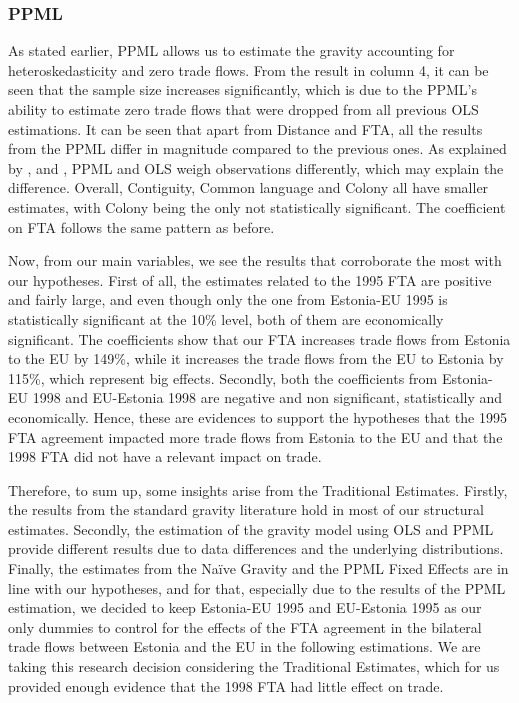 \documentclass[a4paper,10pt]{article}
\begin{document}
\subsubsection{PPML} \label{results_traditional_ppml}

As stated earlier, PPML allows us to estimate the gravity accounting for heteroskedasticity and zero trade flows. From the result in column 4, it can be seen that the sample size increases significantly, which is due to the PPML’s ability to estimate zero trade flows that were dropped from all previous OLS estimations. It can be seen that apart from Distance and FTA, all the results from the PPML differ in magnitude compared to the previous ones. As explained by \cite{larch_currency_2019}, and \cite{head_chapter_2014}, PPML and OLS weigh observations differently, which may explain the difference. Overall, Contiguity, Common language and Colony all have smaller estimates, with Colony being the only not statistically significant. The coefficient on FTA follows the same pattern as before.

Now, from our main variables, we see the results that corroborate the most with our hypotheses. First of all, the estimates related to the 1995 FTA are positive and fairly large, and even though only the one from Estonia-EU 1995 is statistically significant at the 10\% level, both of them are economically significant. The coefficients show that our FTA increases trade flows from Estonia to the EU by 149\%, while it increases the trade flows from the EU to Estonia by 115\%, which represent big effects. Secondly, both the coefficients from Estonia-EU 1998 and EU-Estonia 1998 are negative and non significant, statistically and economically. Hence, these are evidences to support the hypotheses that the 1995 FTA agreement impacted more trade flows from Estonia to the EU and that the 1998 FTA did not have a relevant impact on trade.

Therefore, to sum up, some insights arise from the Traditional Estimates. Firstly, the results from the standard gravity literature hold in most of our structural estimates. Secondly, the estimation of the gravity model using OLS and PPML provide different results due to data differences and the underlying distributions. Finally, the estimates from the Naïve Gravity and the PPML Fixed Effects are in line with our hypotheses, and for that, especially due to the results of the PPML estimation, we decided to keep Estonia-EU 1995 and EU-Estonia 1995 as our only dummies to control for the effects of the FTA agreement in the bilateral trade flows between Estonia and the EU in the following estimations. We are taking this research decision considering the Traditional Estimates, which for us provided enough evidence that the 1998 FTA had little effect on trade.
\end{document}
